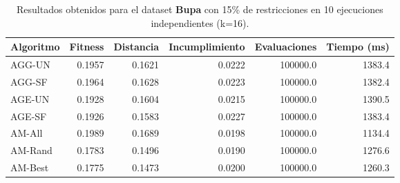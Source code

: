 \begin{table}[H]
    \centering
    \begin{tabular}{lrrrrr}
        \hline
        Algoritmo & Fitness & Distancia & Incumplimiento & Evaluaciones & Tiempo (ms)\\
        \hline
        AGG-UN & 0.1957 & 0.1621 & 0.0222 & 100000.0 & 1383.4 \\
        AGG-SF & 0.1964 & 0.1628 & 0.0223 & 100000.0 & 1382.4 \\
        AGE-UN & 0.1928 & 0.1604 & 0.0215 & 100000.0 & 1390.5 \\
        AGE-SF & 0.1926 & 0.1583 & 0.0227 & 100000.0 & 1383.4 \\
        AM-All & 0.1989 & 0.1689 & 0.0198 & 100000.0 & 1134.4 \\
        AM-Rand & 0.1783 & 0.1496 & 0.0190 & 100000.0 & 1276.6 \\
        AM-Best & 0.1775 & 0.1473 & 0.0200 & 100000.0 & 1260.3 \\
        \hline
    \end{tabular}
    \caption{Resultados obtenidos para el dataset \textbf{Bupa} con 15\% de restricciones en  10 ejecuciones independientes (k=16).}
    \label{tab:res_bupa_15}
\end{table}